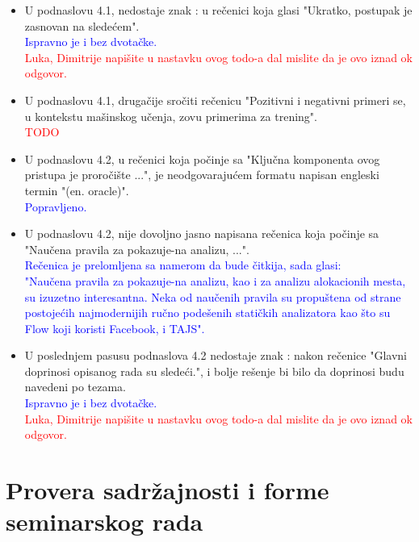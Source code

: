 \documentclass[a4paper]{report}
\newcommand{\odgovor}[1]{\textcolor{blue}{#1}}
\newcommand{\todo}[1]{\textcolor{red}{#1}}
\begin{document}
\begin{itemize}
	\item U podnaslovu 4.1, nedostaje znak : u rečenici koja glasi "Ukratko, postupak je zasnovan na sledećem".
	\\\odgovor{Ispravno je i bez dvotačke.}
	\\\todo{Luka, Dimitrije napišite u nastavku ovog todo-a dal mislite da je ovo iznad ok odgovor.}
	
    \item U podnaslovu 4.1, drugačije sročiti rečenicu "Pozitivni i negativni primeri se, u kontekstu mašinskog učenja, zovu primerima za trening".
    \\\todo{TODO}
    	
    \item U podnaslovu 4.2, u rečenici koja počinje sa "Ključna komponenta ovog pristupa je proročište ...", je neodgovarajućem formatu napisan engleski termin "(en. oracle)".
    \\\odgovor{Popravljeno.}
    
    \item U podnaslovu 4.2, nije dovoljno jasno napisana rečenica koja počinje sa "Naučena pravila za pokazuje-na analizu, ...".
    \\\odgovor{Rečenica je prelomljena sa namerom da bude čitkija, sada glasi:\\
    	"Naučena pravila za pokazuje-na analizu, kao i za
    	analizu alokacionih mesta, su izuzetno interesantna. Neka od naučenih pravila su propuštena od
    	strane postojećih najmodernijih ručno podešenih statičkih analizatora kao što
    	su Flow koji koristi Facebook, i TAJS".
    }
     
    \item U poslednjem pasusu podnaslova 4.2 nedostaje znak : nakon rečenice "Glavni doprinosi opisanog rada su sledeći.", i bolje rešenje bi bilo da doprinosi budu navedeni po tezama.
    \\\odgovor{Ispravno je i bez dvotačke.}
    \\\todo{Luka, Dimitrije napišite u nastavku ovog todo-a dal mislite da je ovo iznad ok odgovor.}
\end{itemize}


\section{Provera sadržajnosti i forme seminarskog rada}
\end{document}
